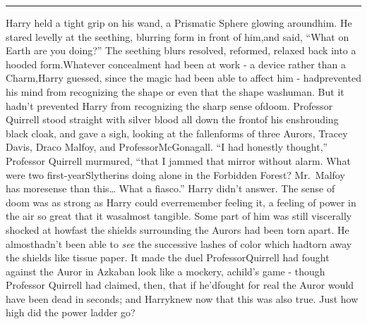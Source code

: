 \begin{center}\rule{3in}{0.4pt}\end{center}
Harry held a tight grip on his wand, a Prismatic Sphere glowing aroundhim. He stared levelly at the seething, blurring form in front of him,and said, ``What on Earth are you doing?''
The seething blurs resolved, reformed, relaxed back into a hooded form.Whatever concealment had been at work - a device rather than a Charm,Harry guessed, since the magic had been able to affect him - hadprevented his mind from recognizing the shape or even that the shape washuman. But it hadn't prevented Harry from recognizing the sharp sense ofdoom.
Professor Quirrell stood straight with silver blood all down the frontof his enshrouding black cloak, and gave a sigh, looking at the fallenforms of three Aurors, Tracey Davis, Draco Malfoy, and ProfessorMcGonagall. ``I had honestly thought,'' Professor Quirrell murmured,
``that I jammed that mirror without alarm. What were two first-yearSlytherins doing alone in the Forbidden Forest? Mr.~Malfoy has moresense than this\ldots{} What a fiasco.''
Harry didn't answer. The sense of doom was as strong as Harry could everremember feeling it, a feeling of power in the air so great that it wasalmost tangible. Some part of him was still viscerally shocked at howfast the shields surrounding the Aurors had been torn apart. He almosthadn't been able to \emph{see} the successive lashes of color which hadtorn away the shields like tissue paper. It made the duel ProfessorQuirrell had fought against the Auror in Azkaban look like a mockery, achild's game - though Professor Quirrell had claimed, then, that if he'dfought for real the Auror would have been dead in seconds; and Harryknew now that this was also true.
Just how high did the power ladder go?

